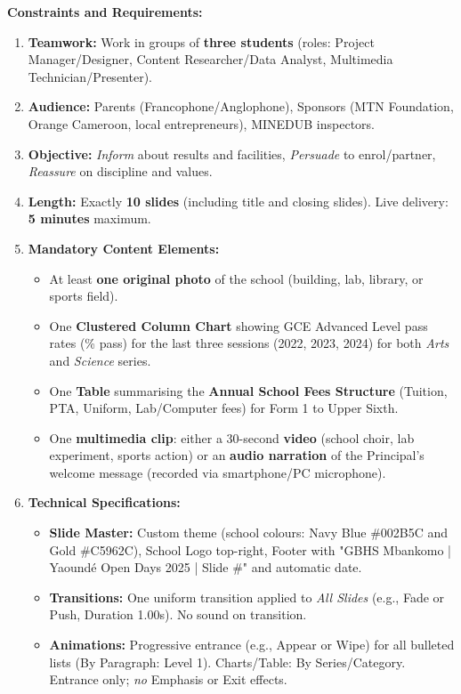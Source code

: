 \documentclass[11pt]{article}
\newcommand{\cle}[1]{{\popxbold\color{popdark}#1}}
\begin{document}
\textbf{Constraints and Requirements:}
\begin{enumerate}
    \item \textbf{Teamwork:} Work in groups of \textbf{three students} (roles: Project Manager/Designer, Content Researcher/Data Analyst, Multimedia Technician/Presenter).
    \item \textbf{Audience:} Parents (Francophone/Anglophone), Sponsors (MTN Foundation, Orange Cameroon, local entrepreneurs), MINEDUB inspectors.
    \item \textbf{Objective:} \emph{Inform} about results and facilities, \emph{Persuade} to enrol/partner, \emph{Reassure} on discipline and values.
    \item \textbf{Length:} Exactly \textbf{10 slides} (including title and closing slides). Live delivery: \textbf{5 minutes} maximum.
    \item \textbf{Mandatory Content Elements:}
        \begin{itemize}
            \item At least \textbf{one original photo} of the school (building, lab, library, or sports field).
            \item One \textbf{Clustered Column Chart} showing GCE Advanced Level pass rates (\% pass) for the last three sessions (2022, 2023, 2024) for both \emph{Arts} and \emph{Science} series.
            \item One \textbf{Table} summarising the \textbf{Annual School Fees Structure} (Tuition, PTA, Uniform, Lab/Computer fees) for Form 1 to Upper Sixth.
            \item One \textbf{multimedia clip}: either a 30-second \textbf{video} (school choir, lab experiment, sports action) or an \textbf{audio narration} of the Principal's welcome message (recorded via smartphone/PC microphone).
        \end{itemize}
    \item \textbf{Technical Specifications:}
        \begin{itemize}
            \item \textbf{Slide Master:} Custom theme (school colours: Navy Blue \#002B5C and Gold \#C5962C), School Logo top-right, Footer with "GBHS Mbankomo | Yaoundé Open Days 2025 | Slide \#" and automatic date.
            \item \textbf{Transitions:} One uniform transition applied to \emph{All Slides} (e.g., \cle{Fade} or \cle{Push}, Duration 1.00s). No sound on transition.
            \item \textbf{Animations:} Progressive entrance (e.g., \cle{Appear} or \cle{Wipe}) for all bulleted lists (By Paragraph: Level 1). Charts/Table: By Series/Category. Entrance only; \emph{no} Emphasis or Exit effects.

\end{itemize}
\end{enumerate}
\end{document}
